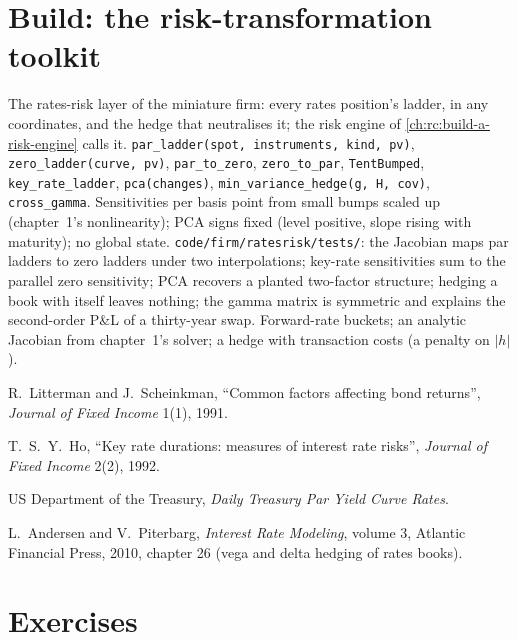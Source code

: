 \section{Build: the risk-transformation toolkit}\label{bld:rc:rates-risk:ratesrisk}

\begin{build}
 The rates-risk layer of the miniature firm: every rates
position's ladder, in any coordinates, and the hedge that neutralises it; the
risk engine of \cref{ch:rc:build-a-risk-engine} calls it.
 \texttt{par\_ladder(spot, instruments, kind, pv)},
\texttt{zero\_ladder(curve, pv)}, \texttt{par\_to\_zero}, \texttt{zero\_to\_par},
\texttt{TentBumped}, \texttt{key\_rate\_ladder}, \texttt{pca(changes)},
\texttt{min\_variance\_hedge(g, H, cov)}, \texttt{cross\_gamma}.
 Sensitivities per basis point from small bumps scaled up
(chapter~1's nonlinearity); PCA signs fixed (level positive, slope rising with
maturity); no global state.
 \texttt{code/firm/ratesrisk/tests/}: the Jacobian maps
par ladders to zero ladders under two interpolations; key-rate sensitivities
sum to the parallel zero sensitivity; PCA recovers a planted two-factor
structure; hedging a book with itself leaves nothing; the gamma matrix is
symmetric and explains the second-order P\&L of a thirty-year swap.
 Forward-rate buckets; an analytic Jacobian from
chapter~1's solver; a hedge with transaction costs (a penalty on $|h|$).
\end{build}

\begin{omsources}
\item R.\ Litterman and J.\ Scheinkman, ``Common factors affecting bond
returns'', \emph{Journal of Fixed Income} 1(1), 1991.
\item T.\ S.\ Y.\ Ho, ``Key rate durations: measures of interest rate risks'',
\emph{Journal of Fixed Income} 2(2), 1992.
\item US Department of the Treasury, \emph{Daily Treasury Par Yield Curve Rates}.
\item L.\ Andersen and V.\ Piterbarg, \emph{Interest Rate Modeling}, volume 3,
Atlantic Financial Press, 2010, chapter 26 (vega and delta hedging of rates books).
\end{omsources}

\section{Exercises}


